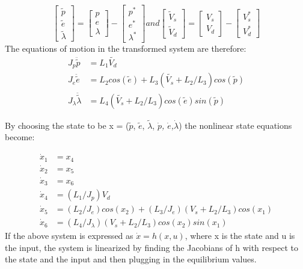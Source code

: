 \begin{equation}
  \label{eq:transformation}
  \begin{bmatrix}
    \tilde{p} \\
    \tilde{e} \\
    \tilde{\lambda}
  \end{bmatrix}
  =
  \begin{bmatrix}
    p \\
    e \\
    \lambda
  \end{bmatrix}
  -
  \begin{bmatrix}
    p^{*} \\
    e^{*} \\
    \lambda^{*}
  \end{bmatrix}
  and
  \begin{bmatrix}
    \tilde{V}_{s} \\
    \tilde{V}_{d}
  \end{bmatrix}
  =
  \begin{bmatrix}
    V_{s} \\
    V_{d}
  \end{bmatrix}
  -
  \begin{bmatrix}
    V^{*}_{s} \\
    V^{*}_{d}
  \end{bmatrix}
\end{equation}
The equations of motion in the transformed system are therefore:
\begin{subequations}
  \begin{align}
    J_p\ddot{\tilde{p}} &= L_1\tilde{V_d} \label{eq:transformed pitch EoM}\\
    J_e\ddot{\tilde{e}} &= L_2cos(\tilde{e}) + L_3(\tilde{V_s}+L_2/L_3)cos(\tilde{p}) \label{eq:transformed elevation EoM}\\
    J_{\lambda}\ddot{\tilde{\lambda}} &= L_4(\tilde{V_s}+L_2/L_3)cos(\tilde{e})sin(\tilde{p}) \label{eq:transformed travel EoM}
  \end{align}
\end{subequations}

By choosing the state to be x = ($\tilde{p}$, $\tilde{e}$,
$\tilde{\lambda}$, \textit{$\dot{p}$, $\dot{e}$,$\dot{\lambda}$}) the
nonlinear state equations become:

\begin{subequations}
  \label{eq:full state equations}
  \begin{align}
    \dot{x}_1 &= x_4 \\
    \dot{x}_2 &= x_5 \\
    \dot{x}_3 &= x_6 \\
    \dot{x}_4 &= (L_1/J_p) V_d \\
    \dot{x}_5 &= (L_2/J_e)cos(x_2) + (L_3/J_e)(V_s + L_2 / L_3)cos(x_1) \\
    \dot{x}_6 &= (L_4 / J_\lambda) (V_s + L_2 / L_3)cos(x_2)sin(x_1)
  \end{align}
\end{subequations}
If the above system is expressed as $\dot{x} = h(x, u)$, where x is
the state and u is the input, the system is linearized by finding the
Jacobians of h with respect to the state and the input and then
plugging in the equilibrium values.

